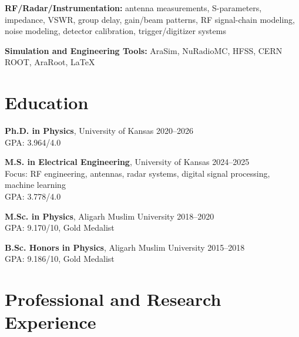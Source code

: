 \documentclass[10pt,letterpaper]{article}
\begin{document}
\textbf{RF/Radar/Instrumentation:} antenna measurements, S-parameters, impedance, VSWR, group delay, gain/beam patterns, RF signal-chain modeling, noise modeling, detector calibration, trigger/digitizer systems

\textbf{Simulation and Engineering Tools:} AraSim, NuRadioMC, HFSS, CERN ROOT, AraRoot, \LaTeX

\section*{Education}

\textbf{Ph.D. in Physics}, University of Kansas \hfill 2020--2026\\
GPA: 3.964/4.0

\textbf{M.S. in Electrical Engineering}, University of Kansas \hfill 2024--2025\\
Focus: RF engineering, antennas, radar systems, digital signal processing, machine learning\\
GPA: 3.778/4.0

\textbf{M.Sc. in Physics}, Aligarh Muslim University \hfill 2018--2020\\
GPA: 9.170/10, Gold Medalist

\textbf{B.Sc. Honors in Physics}, Aligarh Muslim University \hfill 2015--2018\\
GPA: 9.186/10, Gold Medalist

\section*{Professional and Research Experience}
\end{document}
